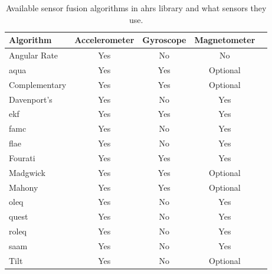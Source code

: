 \begin{table}
    \begin{center}
        \begin{tabular}[t]{lcccc}
            \hline
            Algorithm        & Accelerometer & Gyroscope & Magnetometer \\
            \hline
            Angular Rate     & Yes           & No        & No           \\
            \acrshort{aqua}  & Yes           & Yes       & Optional     \\
            Complementary    & Yes           & Yes       & Optional     \\
            Davenport's      & Yes           & No        & Yes          \\
            \acrshort{ekf}   & Yes           & Yes       & Yes          \\
            \acrshort{famc}  & Yes           & No        & Yes          \\
            \acrshort{flae}  & Yes           & No        & Yes          \\
            Fourati          & Yes           & Yes       & Yes          \\
            Madgwick         & Yes           & Yes       & Optional     \\
            Mahony           & Yes           & Yes       & Optional     \\
            \acrshort{oleq}  & Yes           & No        & Yes          \\
            \acrshort{quest} & Yes           & No        & Yes          \\
            \acrshort{roleq} & Yes           & No        & Yes          \\
            \acrshort{saam}  & Yes           & No        & Yes          \\
            Tilt             & Yes           & No        & Optional     \\
            \hline
        \end{tabular}
        \caption{Available sensor fusion algorithms in \acrshort{ahrs} library and what sensors they use. \cite{ahrs}}
        \label{tab:ahrs_algorithms}
    \end{center}
\end{table}

